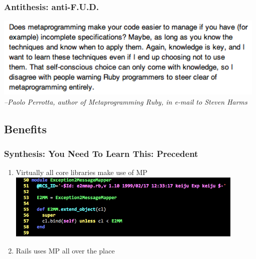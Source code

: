 \documentclass[slidestop,compress,mathserif]{beamer}
\begin{document}
\begin{frame}
	\frametitle{Antithesis:  anti-F.U.D.}
	\includegraphics[width=0.98\textwidth, height=0.45\textheight]{img/paolo_anti_fud.png}
	\vskip 0.5cm
	\emph{--Paolo Perrotta, author of Metaprogramming Ruby, in e-mail to Steven Harms}
\end{frame}

\subsection{Benefits} %
\label{sub:benefits}

\begin{frame}
	\frametitle{Synthesis:  You Need To Learn This:  Precedent}
	\begin{enumerate}
		\item Virtually all core libraries make use of MP
		\pause
		\includegraphics[scale=0.45, width=0.89\textwidth]{img/e2mmap.png}
		\pause
		\item Rails uses MP all over the place
	\end{enumerate}
\end{frame}
\end{document}
